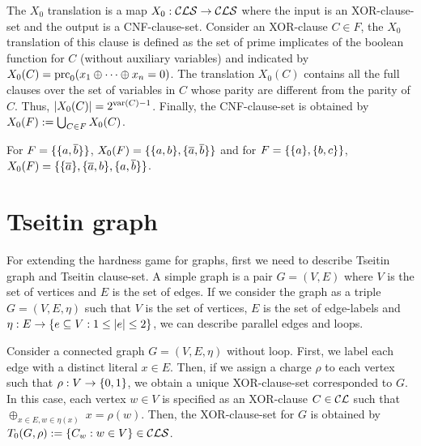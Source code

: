 \documentclass{report}
\begin{document}
\begin{defi}\label{def:x0tr}
The $X_0$ translation is a map $X_0: \mathcal{CLS} \rightarrow \mathcal{CLS}$ where the input is an XOR-clause-set and the output is a  CNF-clause-set. Consider an XOR-clause $C \in F$, the $X_0$ translation of this clause is defined as the set of prime implicates of the boolean function for $C$ (without auxiliary variables) and indicated by $X_0(C)=\operatorname{prc}_0(x_1 \oplus \dots \oplus x_n = 0)$. The translation $X_0(C)$ contains all the full clauses over the set of variables in $C$ whose parity are different from the parity of $C$. Thus, $\lvert X_0(C) \rvert=2^{\operatorname{var}(C)-1}$. Finally, the CNF-clause-set is obtained by $X_0(F) := \bigcup_{C \in F} X_0(C)$.
\end{defi} 

\begin{examp}\label{exp:X0}
For $F=\{ \{ a,\overline b \} \}$, $X_0(F)= \{ \{ a,b \},\{ \overline a,\overline b \} \}$ and for $F=\{ \{ a \},\{ b,c \} \}$, $X_0(F)=\{ \{ \overline a \},\{ \overline a, b \}, \{ a, \overline b \} \}$.
\end{examp}

\section{Tseitin graph}
\label{sec:Tseitin graph}

For extending the hardness game for graphs, first we need to describe Tseitin graph and Tseitin clause-set. A simple graph is a pair $G = (V,E)$ where $V$ is the set of vertices and $E$ is the set of edges. If we consider the graph as a triple $G = (V,E,\eta)$ such that $V$ is the set of vertices, $E$ is the set of edge-labels and $\eta: E \rightarrow \{ e \subseteq V : 1 \le \lvert e \rvert \le 2 \}$, we can describe parallel edges and loops. 

Consider a connected graph $G=(V,E,\eta)$ without loop. First, we label each edge with a distinct literal $x \in E$. Then, if we assign a charge $\rho$ to each vertex such that $\rho: V \rightarrow \{ 0,1 \}$, we obtain a unique XOR-clause-set corresponded to $G$. In this case, each vertex $w \in V$ is specified as an XOR-clause $C \in \mathcal{CL}$ such that $\oplus_{x \in E, w \in \eta(x)} \; x = \rho(w)$. Then, the XOR-clause-set for $G$ is obtained by $T_0(G,\rho) := \{ C_w : w \in V \} \in \mathcal{CLS}$. 
\end{document}
